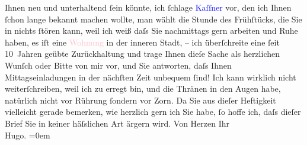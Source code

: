                Ihnen neu und unterhaltend ſein könnte, ich ſchlage \textcolor{blue}{Kaſſner}{}\ledrightnote{\textcolor{blue}{Rudolf Kassner}} vor, den ich Ihnen ſchon lange bekannt machen wollte, man wählt die
               Stunde des Frühſtücks, die Sie in nichts ſtören kann, weil {\pb}ich weiß daſs Sie nachmittags gern
               arbeiten und Ruhe haben, es iſt eine \textcolor{pink}{Wohnung}{} in der inneren Stadt,\pend
           \pstart
           \numberlinefalse{}–\numberlinetrue{}\pend
           \pstart
           ich überſchreite eine ſeit 10 Jahren geübte Zurückhaltung und trage Ihnen dieſe Sache
               als herzlichen Wunſch oder Bitte von {\pb}mir vor, und Sie antworten, daſs
               Ihnen Mittagseinladungen in der nächſten Zeit unbequem ſind!\pend
           \pstart
           Ich kann wirklich nicht weiterſchreiben, weil ich zu erregt bin, und die Thränen in
               den Augen {\pb}habe, natürlich nicht
               vor Rührung ſondern vor Zorn.\pend
           \pstart
           Da Sie aus dieſer Heftigkeit vielleicht gerade bemerken, wie herzlich gern ich Sie
               habe, ſo hoffe ich, daſs dieſer Brief Sie in keiner häſslichen Art ärgern wird.\pend
           \pstart
           Von Herzen Ihr{\\[\baselineskip]}\spacefill\mbox{Hugo.}\pend
           \leftskip=0em{}\endnumbering{}  
      